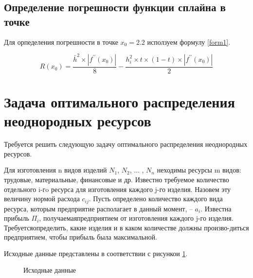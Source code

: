 \documentclass[russian,utf8,nocolumnxxxi,nocolumnxxxii]{eskdtext}
\begin{document}
\subsection{Определение погрешности функции сплайна в точке}

Для орпеделения погрешности в точке $x_0=2.2$ исползуем формулу \eqref{form1}.

\begin{equation} \label{form1}
R(x_0)=\frac{ \bar{h}^2 \times \left | f^{\prime\prime}(x_0)\right |}{8} - \frac{h_i^2 \times t \times (1-t) \times \left | f^{\prime\prime}(x_0)\right | }{2}
\end{equation} \label{form1}




\section{Задача оптимального распределения неоднородных ресурсов}

Требуется решить следующую задачу оптимального распределения неоднородных ресурсов.

Для изготовления n видов изделий $N_1$,  $N_2$, ... , $N_n$ неходимы ресурсы m видов: трудовые, материальные, финансовые и др.  Известно требуемое количество отдельного i-гo ресурса для изготовления каждого j-го изделия. Назовем эту величину нормой расхода $ c_ {ij}$. Пусть определено количество каждого вида ресурса, которым предприятие располагает в данный момент, – $a_i$. Известна прибыль $Π_i$,  получаемаяпредприятием от изготовления каждого j-го изделия. Требуетсяопределить, какие изделия и в каком количестве должны произво-диться предприятием, чтобы прибыль была максимальной.

Исходные данные представлены в соответствии с рисункои \ref{zadn1}.

\begin{figure}[h!]
\begin{center}
\caption{Исходные данные } \label{zadn1}
\end{center}
\end{figure}
\end{document}
